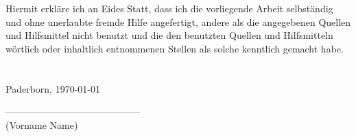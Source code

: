 \noindent
Hiermit erkläre ich an Eides Statt, dass ich die vorliegende Arbeit selbständig und ohne unerlaubte fremde Hilfe angefertigt, andere als die angegebenen Quellen und Hilfsmittel nicht benutzt und die den benutzten Quellen und Hilfsmitteln wörtlich oder inhaltlich entnommenen Stellen als solche kenntlich gemacht habe.\\
\\
\\
Paderborn, \today
\begin{flushright}
------------------------------------------\\
(Vorname Name)
\end{flushright}
